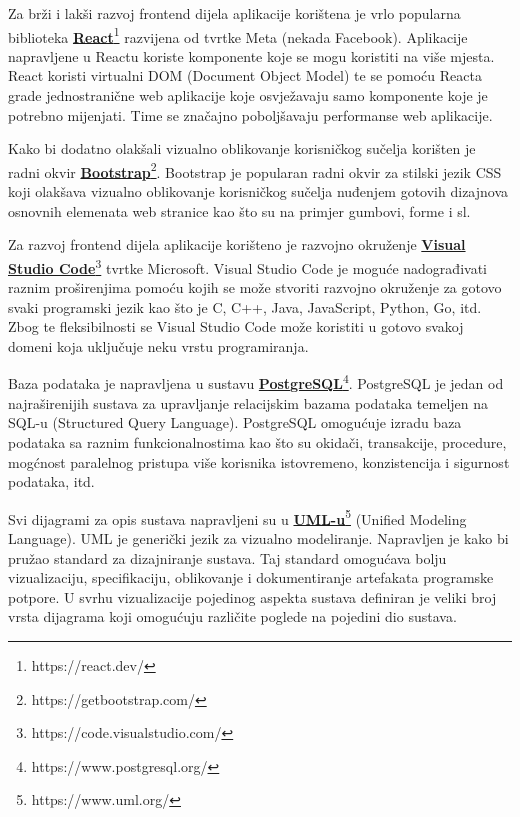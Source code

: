 			Za brži i lakši razvoj frontend dijela aplikacije korištena je vrlo popularna biblioteka  \href{https://react.dev/}{\textbf{React}}\footnote{https://react.dev/} razvijena od tvrtke Meta (nekada Facebook). Aplikacije napravljene u Reactu koriste komponente koje se mogu koristiti na više mjesta. React koristi virtualni DOM (Document Object Model) te se pomoću Reacta grade jednostranične web aplikacije koje osvježavaju samo komponente koje je potrebno mijenjati. Time se značajno poboljšavaju performanse web aplikacije.
			
			Kako bi dodatno olakšali vizualno oblikovanje korisničkog sučelja korišten je radni okvir \href{https://getbootstrap.com/}{\textbf{Bootstrap}}\footnote{https://getbootstrap.com/}. Bootstrap je popularan radni okvir za stilski jezik CSS koji olakšava vizualno oblikovanje korisničkog sučelja nuđenjem gotovih dizajnova osnovnih elemenata web stranice kao što su na primjer gumbovi, forme i sl. 
			
			Za razvoj frontend dijela aplikacije korišteno je razvojno okruženje \href{https://code.visualstudio.com/}{\textbf{Visual Studio Code}}\footnote{https://code.visualstudio.com/} tvrtke Microsoft. Visual Studio Code je moguće nadograđivati raznim proširenjima pomoću kojih se može stvoriti razvojno okruženje za gotovo svaki programski jezik kao što je C, C++, Java, JavaScript, Python, Go, itd. Zbog te fleksibilnosti se Visual Studio Code može koristiti u gotovo svakoj domeni koja uključuje neku vrstu programiranja.
			
			Baza podataka je napravljena u sustavu \href{https://www.postgresql.org/}{\textbf{PostgreSQL}}\footnote{https://www.postgresql.org/}. PostgreSQL je jedan od najraširenijih sustava za upravljanje relacijskim bazama podataka temeljen na SQL-u (Structured Query Language). PostgreSQL omogućuje izradu baza podataka sa raznim funkcionalnostima kao što su okidači, transakcije, procedure, mogćnost paralelnog pristupa više korisnika istovremeno, konzistencija i sigurnost podataka, itd.
			
			Svi dijagrami za opis sustava napravljeni su u \href{https://www.uml.org/}{\textbf{UML-u}}\footnote{https://www.uml.org/} (Unified Modeling Language). UML je generički jezik za vizualno modeliranje. Napravljen je kako bi pružao standard za dizajniranje sustava. Taj standard omogućava bolju vizualizaciju, specifikaciju, oblikovanje i dokumentiranje artefakata programske potpore. U svrhu vizualizacije pojedinog aspekta sustava definiran je veliki broj vrsta dijagrama koji omogućuju različite poglede na pojedini dio sustava.
			
